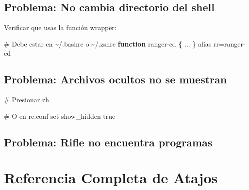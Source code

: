 \documentclass[
  doc,
  floatsintext,
  longtable,
  a4paper,
  nolmodern,
  notxfonts,
  notimes,
  12pt,
  colorlinks=true,linkcolor=blue,citecolor=blue,urlcolor=blue]{apa7}
\newenvironment{Shaded}{\begin{snugshade}}{\end{snugshade}}
\newcommand{\AttributeTok}[1]{\textcolor[rgb]{0.40,0.45,0.13}{#1}}
\newcommand{\BuiltInTok}[1]{\textcolor[rgb]{0.00,0.23,0.31}{#1}}
\newcommand{\CommentTok}[1]{\textcolor[rgb]{0.37,0.37,0.37}{#1}}
\newcommand{\ExtensionTok}[1]{\textcolor[rgb]{0.00,0.23,0.31}{#1}}
\newcommand{\FunctionTok}[1]{\textcolor[rgb]{0.28,0.35,0.67}{#1}}
\newcommand{\KeywordTok}[1]{\textcolor[rgb]{0.00,0.23,0.31}{\textbf{#1}}}
\newcommand{\NormalTok}[1]{\textcolor[rgb]{0.00,0.23,0.31}{#1}}
\newcommand{\StringTok}[1]{\textcolor[rgb]{0.13,0.47,0.30}{#1}}
\newcommand{\VariableTok}[1]{\textcolor[rgb]{0.07,0.07,0.07}{#1}}
\begin{document}
\subsection{Problema: No cambia directorio del
shell}\label{problema-no-cambia-directorio-del-shell}

Verificar que usas la función wrapper:

\begin{Shaded}
\begin{Highlighting}[]
\CommentTok{\# Debe estar en \textasciitilde{}/.bashrc o \textasciitilde{}/.zshrc}
\KeywordTok{function}\FunctionTok{ ranger{-}cd} \KeywordTok{\{} \ExtensionTok{...}\NormalTok{ \}}
\BuiltInTok{alias}\NormalTok{ rr=}\StringTok{\textquotesingle{}ranger{-}cd\textquotesingle{}}
\end{Highlighting}
\end{Shaded}

\subsection{Problema: Archivos ocultos no se
muestran}\label{problema-archivos-ocultos-no-se-muestran}

\begin{Shaded}
\begin{Highlighting}[]
\CommentTok{\# Presionar}
\ExtensionTok{zh}

\CommentTok{\# O en rc.conf}
\BuiltInTok{set}\NormalTok{ show\_hidden true}
\end{Highlighting}
\end{Shaded}

\subsection{Problema: Rifle no encuentra
programas}\label{problema-rifle-no-encuentra-programas}

\begin{Shaded}
\end{Shaded}

\section{Referencia Completa de
Atajos}\label{referencia-completa-de-atajos}
\end{document}
